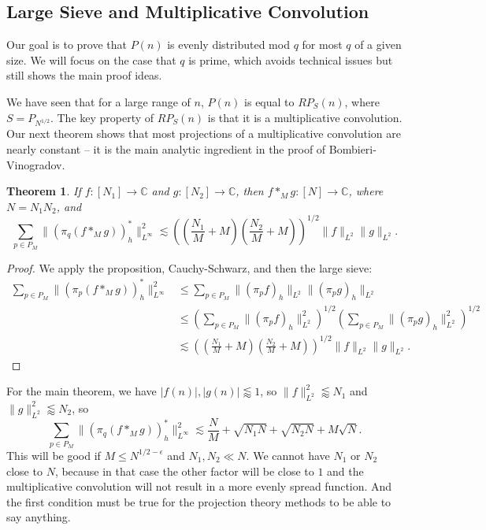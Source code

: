 \documentclass[12pt]{amsart}
\newtheorem{theorem}{Theorem}[section]
\begin{document}
\subsection{Large Sieve and Multiplicative Convolution}

Our goal is to prove that $P(n)$ is evenly distributed mod $q$ for most $q$ of a given size.   We will focus on the case that $q$ is prime,  which avoids technical issues but still shows the main proof ideas.

We have seen that for a large range of $n$, $P(n)$ is equal to $RP_S(n)$,  where $S = P_{N^{1/2}}$.   The key property of $RP_S(n)$ is that it is a multiplicative convolution.   Our next theorem shows that most projections of a multiplicative convolution are nearly constant -- it is the main analytic ingredient in the proof of Bombieri-Vinogradov.


\begin{theorem}
    If $f : [N_1] \to \mathbb{C}$ and $g : [N_2] \to \mathbb{C}$, then $f *_M g : [N] \to \mathbb{C}$, where $N = N_1 N_2$, and
    \[
        \sum_{p \in P_M} \lVert (\pi_q(f *_M g))_h^* \rVert_{L^\infty}^2 \lesssim \left( \left( \frac{N_1}{M} + M \right) \left( \frac{N_2}{M} + M \right) \right)^{1/2} \lVert f \rVert_{L^2} \lVert g \rVert_{L^2}.
    \]
\end{theorem}
\begin{proof}
    We apply the proposition, Cauchy-Schwarz, and then the large sieve:
    \begin{align*}
        \sum_{p \in P_M} \lVert (\pi_p(f *_M g))_h^* \rVert_{L^\infty}^2 & \leq \sum_{p \in P_M} \lVert (\pi_p f)_h \rVert_{L^2} \lVert (\pi_p g)_h \rVert_{L^2} \\
        & \leq \left( \sum_{p \in P_M} \lVert (\pi_p f)_h \rVert_{L^2}^2 \right)^{1/2} \left( \sum_{p \in P_M} \lVert (\pi_p g)_h \rVert_{L^2}^2 \right)^{1/2} \\
        & \lesssim \left( \left( \frac{N_1}{M} + M \right) \left( \frac{N_2}{M} + M \right) \right)^{1/2} \lVert f \rVert_{L^2} \lVert g \rVert_{L^2}.
    \end{align*}
\end{proof}
For the main theorem, we have $|f(n)|, |g(n)| \lessapprox 1$, so $\lVert f \rVert_{L^2}^2 \lessapprox N_1$ and $\lVert g \rVert_{L^2}^2 \lessapprox N_2$, so
\[
    \sum_{p \in P_M} \lVert (\pi_q(f *_M g))_h^* \rVert_{L^\infty}^2 \lesssim \frac{N}{M} + \sqrt{N_1 N} + \sqrt{N_2 N} + M \sqrt{N}.
\]
This will be good if $M \leq N^{1/2 - \epsilon}$ and $N_1, N_2 \ll N$. We cannot have $N_1$ or $N_2$ close to $N$, because in that case the other factor will be close to $1$ and the multiplicative convolution will not result in a more evenly spread function. And the first condition must be true for the projection theory methods to be able to say anything.
\end{document}
